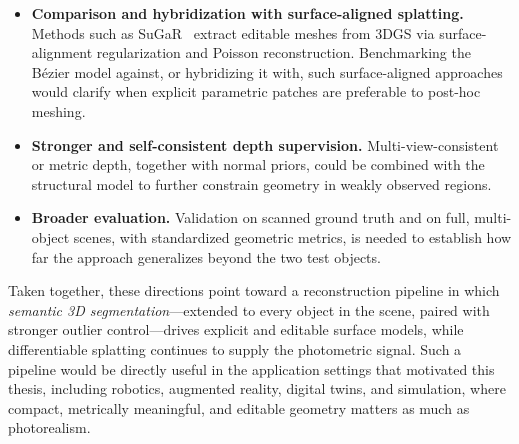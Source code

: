 \documentclass{report}
\begin{document}
\begin{itemize}
    \item \textbf{Comparison and hybridization with surface-aligned splatting.} Methods such as SuGaR~\cite{guedon2024sugar} extract editable meshes from 3DGS via surface-alignment regularization and Poisson reconstruction. Benchmarking the B\'ezier model against, or hybridizing it with, such surface-aligned approaches would clarify when explicit parametric patches are preferable to post-hoc meshing.
    \item \textbf{Stronger and self-consistent depth supervision.} Multi-view-consistent or metric depth, together with normal priors, could be combined with the structural model to further constrain geometry in weakly observed regions.
    \item \textbf{Broader evaluation.} Validation on scanned ground truth and on full, multi-object scenes, with standardized geometric metrics, is needed to establish how far the approach generalizes beyond the two test objects.
\end{itemize}

Taken together, these directions point toward a reconstruction pipeline in which \emph{semantic 3D segmentation}---extended to every object in the scene, paired with stronger outlier control---drives explicit and editable surface models, while differentiable splatting continues to supply the photometric signal. Such a pipeline would be directly useful in the application settings that motivated this thesis, including robotics, augmented reality, digital twins, and simulation, where compact, metrically meaningful, and editable geometry matters as much as photorealism.



\end{document}
